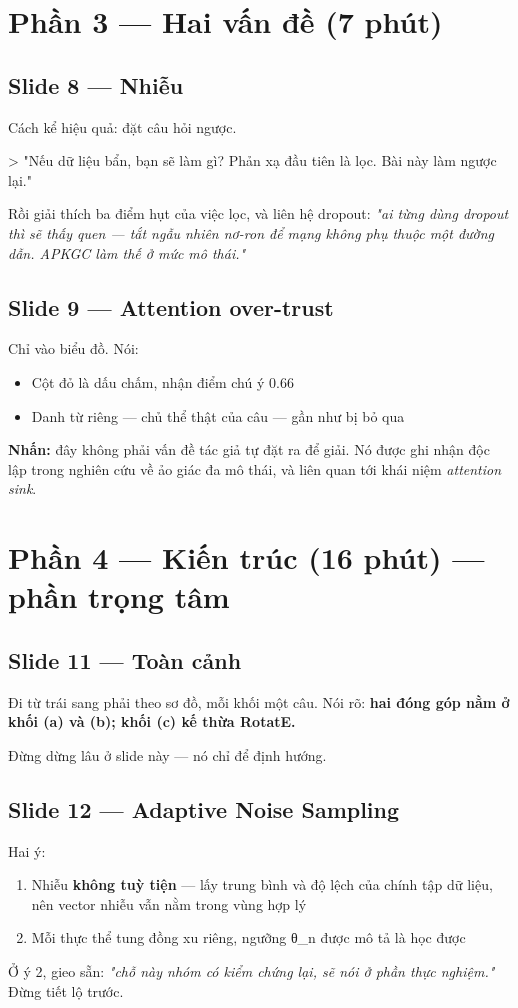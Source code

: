 \documentclass[11pt,a4paper]{article}
\newcommand{\code}[1]{{\ttfamily\small\color{codetext}#1}}
\begin{document}
\section{Phần 3 --- Hai vấn đề (7 phút)}
\subsection{Slide 8 --- Nhiễu}
Cách kể hiệu quả: đặt câu hỏi ngược.

> "Nếu dữ liệu bẩn, bạn sẽ làm gì? Phản xạ đầu tiên là lọc. Bài này làm ngược lại."

Rồi giải thích ba điểm hụt của việc lọc, và liên hệ dropout: \emph{"ai từng dùng dropout thì sẽ thấy quen --- tắt ngẫu nhiên nơ-ron để mạng không phụ thuộc một đường dẫn. APKGC làm thế ở mức mô thái."}

\subsection{Slide 9 --- Attention over-trust}
Chỉ vào biểu đồ. Nói:

\begin{itemize}\itemsep2pt
\item Cột đỏ là dấu chấm, nhận điểm chú ý 0.66
\item Danh từ riêng --- chủ thể thật của câu --- gần như bị bỏ qua
\end{itemize}
\textbf{Nhấn:} đây không phải vấn đề tác giả tự đặt ra để giải. Nó được ghi nhận độc lập trong nghiên cứu về ảo giác đa mô thái, và liên quan tới khái niệm \emph{attention sink}.

\section{Phần 4 --- Kiến trúc (16 phút) --- phần trọng tâm}
\subsection{Slide 11 --- Toàn cảnh}
Đi từ trái sang phải theo sơ đồ, mỗi khối một câu. Nói rõ: \textbf{hai đóng góp nằm ở khối (a) và (b); khối (c) kế thừa RotatE.}

Đừng dừng lâu ở slide này --- nó chỉ để định hướng.

\subsection{Slide 12 --- Adaptive Noise Sampling}
Hai ý:

\begin{enumerate}\itemsep2pt
\item Nhiễu \textbf{không tuỳ tiện} --- lấy trung bình và độ lệch của chính tập dữ liệu, nên vector nhiễu vẫn nằm trong vùng hợp lý
\item Mỗi thực thể tung đồng xu riêng, ngưỡng \code{θ\_n} được mô tả là học được
\end{enumerate}
Ở ý 2, gieo sẵn: \emph{"chỗ này nhóm có kiểm chứng lại, sẽ nói ở phần thực nghiệm."} Đừng tiết lộ trước.
\end{document}
